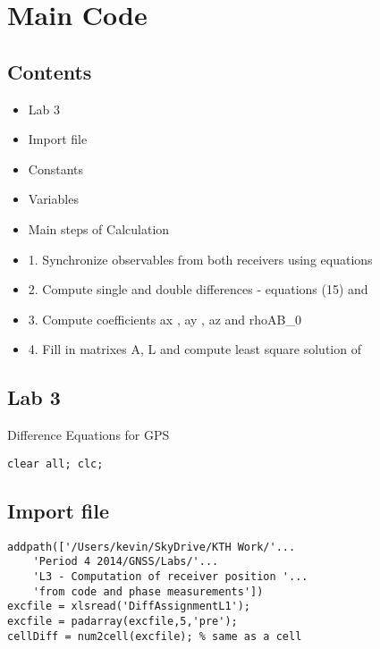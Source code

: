 

  \section{Main Code} %
  \label{sec:main_code}

    
\subsection*{Contents}

\begin{itemize}
\setlength{\itemsep}{-1ex}
   \item Lab 3
   \item Import file
   \item Constants
   \item Variables
   \item Main steps of Calculation
   \item 1. Synchronize observables from both receivers using equations
   \item 2. Compute single and double differences - equations (15) and
   \item 3. Compute coefficients ax , ay , az and rhoAB\_0
   \item 4. Fill in matrixes A, L and compute least square solution of
\end{itemize}


\subsection*{Lab 3}

\begin{par}
Difference Equations for GPS
\end{par} \vspace{1em}
\begin{verbatim}
clear all; clc;
\end{verbatim}


\subsection*{Import file}

\begin{verbatim}
addpath(['/Users/kevin/SkyDrive/KTH Work/'...
    'Period 4 2014/GNSS/Labs/'...
    'L3 - Computation of receiver position '...
    'from code and phase measurements'])
excfile = xlsread('DiffAssignmentL1');
excfile = padarray(excfile,5,'pre');
cellDiff = num2cell(excfile); % same as a cell
\end{verbatim}


